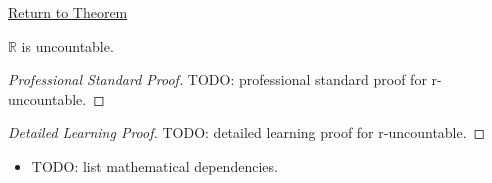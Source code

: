 \newpage
{}
\label{prf:r-uncountable}

\begin{remark*}[Return]
\hyperref[prop:r-uncountable]{Return to Theorem}
\end{remark*}

\begin{proposition*}[r-uncountable]
$\mathbb{R}$ is uncountable.
\end{proposition*}

\begin{proof}[Professional Standard Proof]
\LRAProofBodyStart
TODO: professional standard proof for r-uncountable.
\end{proof}

\begin{proof}[Detailed Learning Proof]
\LRAProofBodyStart
TODO: detailed learning proof for r-uncountable.
\end{proof}

\begin{remark*}
\end{remark*}

\begin{dependencies}
\begin{itemize}
  \item TODO: list mathematical dependencies.
\end{itemize}
\end{dependencies}

\clearpage
